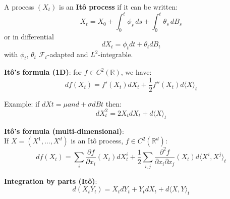 \begin{f}
	
A process \((X_t)\) is an \textbf{Itô process} if it can be written:
	\[
	X_t = X_0 + \int_0^t \phi_s\, ds + \int_0^t \theta_s\, dB_s
	\]
	or in differential
	\[dX_t = \phi_t dt + \theta_t dB_t\]
	with \(\phi_t\), \(\theta_t\) \(\mathcal{F}_t\)-adapted and \(L^2\)-integrable.
	
	\textbf{Itô's formula (1D)}: for \(f \in C^2(\mathbb{R})\), we have:
	\[
	df(X_t) = f'(X_t) dX_t + \frac{1}{2} f''(X_t) d\langle X \rangle_t
	\]
	
	Example: if \(dXt = \mu and + \sigma dBt\) then:
	\[
	dX_t^2 = 2X_t dX_t + d\langle X \rangle_t
	\]
	
	\textbf{Itô's formula (multi-dimensional)}:\\
	If \(X = (X^1, \dots, X^d)\) is an Itô process, \(f \in C^2(\mathbb{R}^d)\):
	\[
	df(X_t) = \sum_i \frac{\partial f}{\partial x_i}(X_t) dX^i_t
	+ \frac{1}{2} \sum_{i,j} \frac{\partial^2 f}{\partial x_i \partial x_j}(X_t) d\langle X^i, X^j \rangle_t
	\]
	
	\textbf{Integration by parts (Itô)}:
	\[
	d(X_t Y_t) = X_t dY_t + Y_t dX_t + d\langle X, Y \rangle_t
	\]
	
\end{f}

